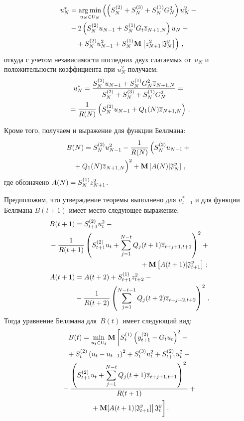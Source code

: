 \begin{multicols}{2}
\noindent
\begin{multline*}
u_N^* =\mathop{\mathrm{arg}\,\mathrm{min}}\limits_{u_N\in U_N} \left( \left( S_N^{(2)}+S_N^{(3)} +S_N^{(1)}G_N^2\right) 
u_N^2- {}\right.\\
{}-2\left( S_N^{(2)} u_{N-1} +S_N^{(1)} G_t \overline{z}_{N+1,N}\right) u_N+{}\\
\left.{}+ S_N^{(2)} u^2_{N-1}+S_N^{(1)}\mathbf{M}\left[ z^2_{N+1}\vert 
\mathfrak{J}_N^y\right]\right)\,,
\end{multline*}
откуда с учетом независимости последних двух слагаемых от~$u_N$ и положительности 
коэффициента при $u_N^2$ получаем:
\begin{multline*}
u_N^*=\displaystyle\frac{\displaystyle S_N^{(2)} u_{N-1}+S_N^{(1)} G^2_N 
\overline{z}_{N+1,N}\mathstrut}{\displaystyle S_N^{(2)}+S_N^{(3)}+S_N^{(1)}G_N^2\mathstrut}={}\\
{}=\displaystyle\frac{\displaystyle 1\mathstrut}{\displaystyle R(N)\mathstrut}\left(S_N^{(2)}
u_{N-1}+Q_1(N)\overline{z}_{N+1,N}\right)\,.
\end{multline*}

  Кроме того, получаем и выражение для функции Беллмана:
  \begin{multline*}
  B(N) =S_N^{(2)} u_{N-1}^2 - \fr{1}{R(N)} \left( S_N^{(2)} u_{N-1} +{}\right.\\
\left.  {}+Q_1(N) 
\overline{z}_{N+1,N}
\vphantom{S_N^{(2)}}\right)^2+\mathbf{M}\left[ A(N)\vert \mathfrak{J}_N^y\right]\,,
  \end{multline*}
где обозначено  $A(N)\hm= S_N^{(1)} z^2_{N+1}$.
  
  Предположим, что утверждение теоремы выполнено для $u^*_{t+1}$ и для функции 
Беллмана $B(t+1)$ имеет место следующее выражение:
  \begin{align*}
  B(t+1) &=S_{t+1}^{(2)} u_t^2-{}\\
 &\hspace*{-13mm} {}- \fr{1}{R(t+1)}\left( 
  S^{(2)}_{t+1} u_t 
+\sum\limits_{j=1}^{N-t} Q_j
  (t+1)\overline{z}_{t+j+1,t+1}\right)^2+{}\\
 & \hspace*{33mm}{}+ \mathbf{M}\left[ A(t+1)\vert 
\mathfrak{J}^y_{t+1}\right]\,;\\
  A(t+1) &= A(t+2) +S_{t+1}^{(1)}  z_{t+2}^2-{}\\
&  {}-
  \fr{1}{R(t+2)}\left(\sum\limits_{j=1}^{N-t-1} Q_j(t+2) \overline{z}_{t+j+2,t+2}\right)^2\,.
  \end{align*}
  Тогда уравнение Беллмана для~$B(t)$ имеет сле\-ду\-ющий вид:
  \begin{multline*}
  B(t) =\min\limits_{u_t\in U_t} \mathbf{M}\left[
  S_t^{(1)}\left( y_{t+1}^{(2)}-G_t u_t\right)^2+{}\right.\\
  {}+S_t^{(2)}\left( u_t-u_{t-1}\right)^2+S_t^{(3)} u_t^2+S_{t+1}^{(2)} u_t^2-{}\\
  {}-\fr{\left(S_{t+1}^{(2)}u_t+\sum\limits_{j=1}^{N-t} 
Q_j(t+1)\overline{z}_{t+j+1,t+1}\right)^2}{R(t+1)}+{}\\
\left.\left.  {}+\mathbf{M}[A(t+1)\vert \mathfrak{J}^y_{t+1}]
  \right\vert
  \mathfrak{J}_t^y
  \vphantom{S_t^{(1)}\left( y_{t+1}^{(2)}-G_t u_t\right)^2}\right].
  \end{multline*}


\end{multicols}
